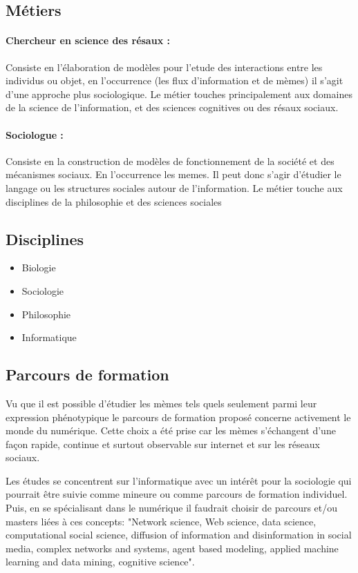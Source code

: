 \documentclass[12pt]{article}
\providecommand{\tightlist}{%
  \setlength{\itemsep}{0pt}\setlength{\parskip}{0pt}}
\begin{document}
\subsection{Métiers}
\paragraph{Chercheur en science des résaux :} 
Consiste en l’élaboration de modèles pour  l’etude des interactions entre les individus ou objet, en l’occurrence (les flux d’information et de mèmes) il s’agit d’une approche plus sociologique.
Le métier touches principalement aux domaines de la science de l’information, et des sciences cognitives ou des résaux sociaux.
\paragraph{Sociologue :}
Consiste en la construction de modèles de fonctionnement de la société et des mécanismes sociaux. En l’occurrence les memes. Il peut donc s’agir d’étudier le langage ou les structures sociales autour de l’information.
Le métier touche aux disciplines de la philosophie et des sciences sociales
\subsection{Disciplines}

\begin{itemize}
\tightlist
\item
  Biologie
\item
  Sociologie
\item
  Philosophie
\item
	Informatique
\end{itemize}


\subsection{Parcours de formation}

Vu que il est possible d'étudier les mèmes tels quels seulement parmi leur expression phénotypique le parcours de formation proposé concerne activement le monde du numérique. Cette choix a été prise car les mèmes s'échangent d'une façon rapide, continue et surtout observable sur internet et sur les réseaux sociaux. 

Les études se concentrent sur l'informatique avec un intérêt pour la sociologie qui pourrait être suivie comme mineure ou comme parcours de formation individuel.
Puis, en se spécialisant dans le numérique il faudrait choisir de parcours et/ou masters liées à ces concepts: "Network  science,  Web  science,  data  science,  computational  social  science,  diffusion  of  information  and  
disinformation  in  social  media,  complex  networks  and  systems,  agent  based modeling,  applied  machine learning  and  data  mining,  cognitive  science".
\end{document}
